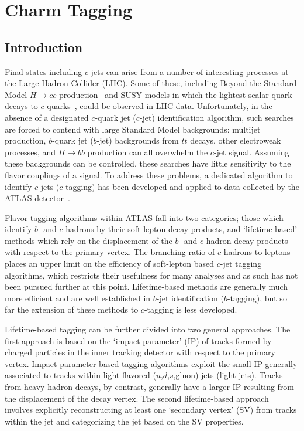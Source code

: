 \chapter{Charm Tagging}

\section{Introduction}
\label{tag:sec:into}

\newcommand{\catpt}{15, 25, 35, 50, 80, 120, 200, $\infty$}
\newcommand{\cateta}{0, 0.7, 1.5, 2.5}
\newcommand{\jfcplotswherefrom}{The jets are from $t \bar{t}$ simulated events generated with \textsc{Powheg+Pythia6}.}

Final states including $c$-jets can arise from a number of interesting processes at the Large Hadron Collider (LHC).
Some of these, including Beyond the Standard Model $H \to c\bar{c}$ production~\cite{charminghiggs} and SUSY models in which the lightest scalar quark decays to $c$-quarks~\cite{stoptocharm}, could be observed in LHC data.
Unfortunately, in the absence of a designated $c$-quark jet ($c$-jet) identification algorithm, such searches are forced to contend with large Standard Model backgrounds: multijet production, $b$-quark jet ($b$-jet) backgrounds from $t\bar{t}$ decays, other electroweak processes, and $H \to b\bar{b}$ production can all overwhelm the $c$-jet signal.
Assuming these backgrounds can be controlled, these searches have little sensitivity to the flavor couplings of a signal.
To address these problems, a dedicated algorithm to identify $c$-jets ($c$-tagging) has been developed and applied to data collected by the ATLAS detector~\cite{DetPap}.

Flavor-tagging algorithms within ATLAS fall into two categories; those which identify $b$- and $c$-hadrons by their soft lepton decay products, and `lifetime-based' methods which rely on the displacement of the $b$- and $c$-hadron decay products with respect to the primary vertex.
The branching ratio of $c$-hadrons to leptons places an upper limit on the efficiency of soft-lepton based $c$-jet tagging algorithms, which restricts their usefulness for many analyses and as such has not been pursued further at this point.
Lifetime-based methods are generally much more efficient and are well established in $b$-jet identification ($b$-tagging), but so far the extension of these methods to $c$-tagging is less developed.

Lifetime-based tagging can be further divided into two general approaches. The first approach is based on the `impact parameter' (IP) of tracks formed by charged particles in the inner tracking detector with respect to the primary vertex. Impact parameter based tagging algorithms exploit the small IP generally associated to tracks within light-flavored ($u$,$d$,$s$,gluon) jets (light-jets). Tracks from heavy hadron decays, by contrast, generally have a larger IP resulting from the displacement of the decay vertex. The second lifetime-based approach involves explicitly reconstructing at least one `secondary vertex' (SV) from tracks within the jet and categorizing the jet based on the SV properties.

